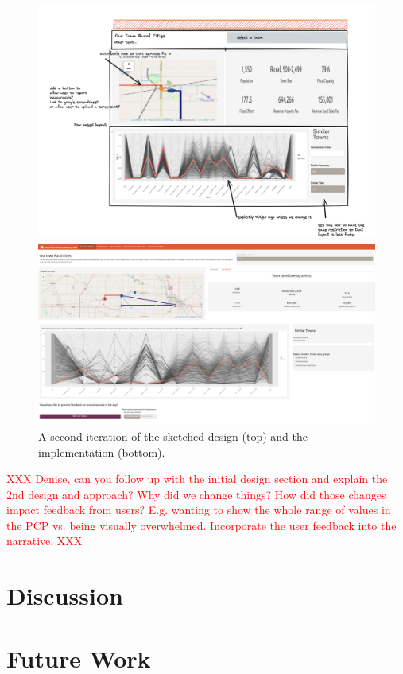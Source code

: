 \documentclass[letterpaper,inpress]{jdsart}
\begin{document}
\begin{figure}
\includegraphics[width=.8\textwidth]{Version3}

\includegraphics[width=\textwidth]{Version4}
\caption{A second iteration of the sketched design (top) and the implementation (bottom).}\label{fig:v2}
\end{figure}

{\textcolor{red}{XXX Denise, can you follow up with the initial design section and explain the 2nd design and approach? Why did we change things? How did those changes impact feedback from users? E.g. wanting to show the whole range of values in the PCP vs. being visually overwhelmed. Incorporate the user feedback into the narrative. XXX}}

\hypertarget{discussion}{%
\section{Discussion}\label{discussion}}

\hypertarget{future-work}{%
\section{Future Work}\label{future-work}}
\end{document}
